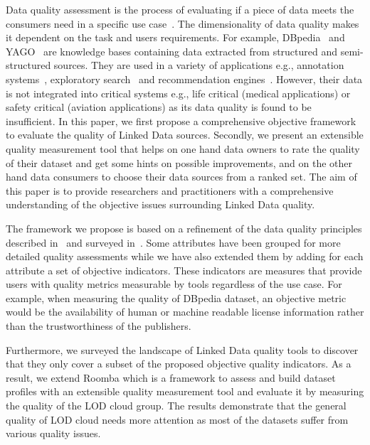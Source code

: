 \documentclass[onecolumn, crcready]{../../Util/LaTEX/iosart2c}
\begin{document}
Data quality assessment is the process of evaluating if a piece of data meets the consumers need in a specific use case~\cite{Bizer:WebSemantics:09}. The dimensionality of data quality makes it dependent on the task and users requirements. For example, DBpedia~\cite{Bizer:WebSemJorunal:09} and YAGO~\cite{Suchanek::WWW:07} are knowledge bases containing data extracted from structured and semi-structured sources. They are used in a variety of applications  e.g., annotation systems~\cite{Mendes:ICS:11}, exploratory search~\cite{Marie:ICS:13} and recommendation engines~\cite{DiNoia:iSemantics:12}. However, their data is not integrated into critical systems e.g., life critical (medical applications) or safety critical (aviation applications) as its data quality is found to be insufficient. In this paper, we first propose a comprehensive objective framework to evaluate the quality of Linked Data sources. Secondly, we present an extensible quality measurement tool that helps on one hand data owners to rate the quality of their dataset and get some hints on possible improvements, and on the other hand data consumers to choose their data sources from a ranked set. The aim of this paper is to provide researchers and practitioners with a comprehensive understanding of the objective issues surrounding Linked Data quality.

The framework we propose is based on a refinement of the data quality principles described in~\cite{Assaf:DQMST:12} and surveyed in~\cite{Zaveri:SemWebJorunal:12}. Some attributes have been grouped for more detailed quality assessments while we have also extended them by adding for each attribute a set of objective indicators. These indicators are measures that provide users with quality metrics measurable by tools regardless of the use case. For example, when measuring the quality of DBpedia dataset, an objective metric would be the availability of human or machine readable license information rather than the trustworthiness of the publishers.

Furthermore, we surveyed the landscape of Linked Data quality tools to discover that they only cover a subset of the proposed objective quality indicators. As a result, we extend Roomba which is a framework to assess and build dataset profiles with an extensible quality measurement tool and evaluate it by measuring the quality of the LOD cloud group. The results demonstrate that the general quality of LOD cloud needs more attention as most of the datasets suffer from various quality issues.
\end{document}
